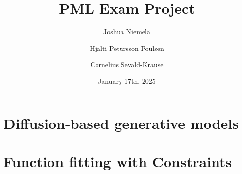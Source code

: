 \documentclass{article}
\begin{document}
\title{PML Exam Project}
\author{
  Joshua Niemelä
  \and
  Hjalti Petursson Poulsen
  \and
  Cornelius Sevald-Krause
}
\date{January 17th, 2025}
\maketitle

\section{Diffusion-based generative models}


\section{Function fitting with Constraints}


\printbibliography

\appendix

\end{document}
